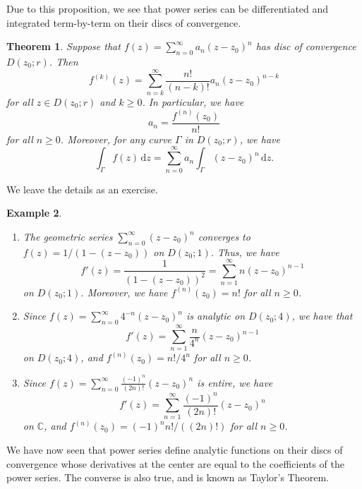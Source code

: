 \documentclass[10pt]{article}
\makeatletter
\newcommand{\C}{\mathbb{C}}
\newcommand{\dd}{\,\mathrm{d}}
\theoremstyle{newstyle}
\newtheorem{thm}{Theorem}[section]
\newtheorem{exmp}[thm]{Example}
\newenvironment{pf}[1][\proofname]{\par
  \pushQED{\qed}%
  \normalfont \topsep0\p@\relax
  \trivlist
  \item[\hskip\labelsep\scshape
  #1\@addpunct{.}]\ignorespaces
}{%
  \popQED\endtrivlist\@endpefalse
}
\makeatother
\begin{document}
Due to this proposition, we see that power series can be differentiated and integrated 
term-by-term on their discs of convergence. 

\begin{thm}
Suppose that $f(z) = \sum_{n=0}^\infty a_n(z-z_0)^n$ has disc of convergence $D(z_0; r)$. 
Then 
\[ f^{(k)}(z) = \sum_{n=k}^\infty \frac{n!}{(n-k)!} a_n(z-z_0)^{n-k} \]
for all $z \in D(z_0; r)$ and $k \geq 0$. In particular, we have 
\[ a_n = \frac{f^{(n)}(z_0)}{n!} \]
for all $n \geq 0$. Moreover, for any curve $\Gamma$ in $D(z_0; r)$, we have 
\[ \int_\Gamma f(z)\dd z = \sum_{n=0}^\infty a_n \int_\Gamma (z-z_0)^n \dd z. \]
\end{thm}
\begin{pf}
We leave the details as an exercise. 
\end{pf}

\begin{exmp}~
\begin{enumerate}[(1)]
    \item The geometric series $\sum_{n=0}^\infty (z-z_0)^n$ converges to 
    $f(z) = 1/(1-(z-z_0))$ on $D(z_0; 1)$. Thus, we have 
    \[ f'(z) = \frac{1}{(1-(z-z_0))^2} = \sum_{n=1}^\infty n(z-z_0)^{n-1} \]
    on $D(z_0; 1)$. Moreover, we have $f^{(n)}(z_0) = n!$ for all $n \geq 0$. 
    \item Since $f(z) = \sum_{n=0}^\infty 4^{-n}(z-z_0)^n$ is analytic on $D(z_0; 4)$, we have that 
    \[ f'(z) = \sum_{n=1}^\infty \frac{n}{4^n} (z-z_0)^{n-1} \]
    on $D(z_0; 4)$, and $f^{(n)}(z_0) = n!/4^n$ for all $n \geq 0$. 
    \item Since $f(z) = \sum_{n=0}^\infty \frac{(-1)^n}{(2n)!}(z-z_0)^n$ is entire, we have 
    \[ f'(z) = \sum_{n=1}^\infty \frac{(-1)^n}{(2n)!} (z-z_0)^n \] 
    on $\C$, and $f^{(n)}(z_0) = (-1)^n n!/((2n)!)$ for all $n \geq 0$. 
\end{enumerate}
\end{exmp}

We have now seen that power series define analytic functions on their discs of 
convergence whose derivatives at the center are equal to the coefficients of the power 
series. The converse is also true, and is known as Taylor's Theorem. 
\end{document}
